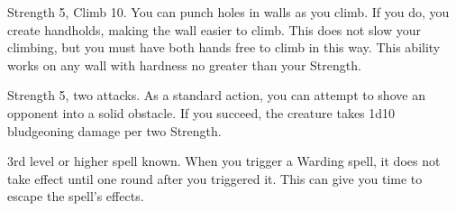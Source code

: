 \featpres Strength 5, Climb 10.
\featben You can punch holes in walls as you climb.
If you do, you create handholds, making the wall easier to climb.
This does not slow your climbing, but you must have both hands free to climb in this way.
This ability works on any wall with hardness no greater than your Strength.

\featpres Strength 5, two attacks.
\featben As a standard action, you can attempt to shove an opponent into a solid obstacle.
If you succeed, the creature takes 1d10 bludgeoning damage per two Strength.

\featpre 3rd level or higher  spell known.
\featben When you trigger a Warding spell, it does not take effect until one round after you triggered it. This can give you time to escape the spell's effects.

